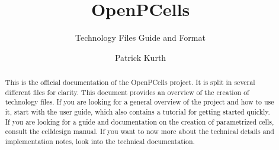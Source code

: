 

\title{OpenPCells}
\subtitle{Technology Files Guide and Format}
\author{Patrick Kurth}


\maketitle
\begin{abstract}
    \noindent This is the official documentation of the OpenPCells project. It is split in several different files for clarity. 
    This document provides an overview of the creation of technology files.
    If you are looking for a general overview of the project and how to use it, start with the user guide, which also contains a tutorial for getting started quickly. 
    If you are looking for a guide and documentation on the creation of parametrized cells, consult the celldesign manual.
    If you want to now more about the technical details and implementation notes, look into the technical documentation.
\end{abstract}


